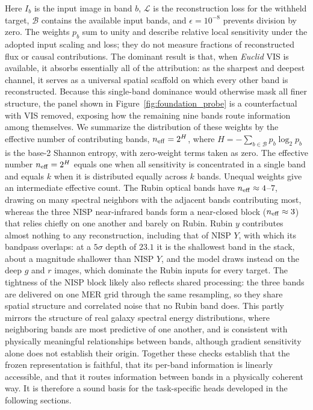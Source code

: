\documentclass[twocolumn,linenumbers]{aastex701}
\begin{document}
Here $I_b$ is the input image in band $b$, $\mathcal L$ is the reconstruction loss for the withheld target, $\mathcal B$ contains the available input bands, and $\epsilon=10^{-8}$ prevents division by zero. The weights $p_b$ sum to unity and describe relative local sensitivity under the adopted input scaling and loss; they do not measure fractions of reconstructed flux or causal contributions. The dominant result is that, when \textit{Euclid} VIS is available, it absorbs essentially all of the attribution: as the sharpest and deepest channel, it serves as a universal spatial scaffold on which every other band is reconstructed. Because this single-band dominance would otherwise mask all finer structure, the panel shown in Figure~\ref{fig:foundation_probe} is a counterfactual with VIS removed, exposing how the remaining nine bands route information among themselves. We summarize the distribution of these weights by the effective number of contributing bands, $n_{\rm eff}=2^H$, where $H=-\sum_{b\in\mathcal B}p_b\log_2p_b$ is the base-2 Shannon entropy, with zero-weight terms taken as zero. The effective number $n_{\rm eff}=2^H$ equals one when all sensitivity is concentrated in a single band and equals $k$ when it is distributed equally across $k$ bands. Unequal weights give an intermediate effective count. The Rubin optical bands have $n_{\rm eff} \approx 4$--$7$, drawing on many spectral neighbors with the adjacent bands contributing most, whereas the three NISP near-infrared bands form a near-closed block ($n_{\rm eff} \approx 3$) that relies chiefly on one another and barely on Rubin. Rubin $y$ contributes almost nothing to any reconstruction, including that of NISP $Y$, with which its bandpass overlaps: at a $5\sigma$ depth of $23.1$ it is the shallowest band in the stack, about a magnitude shallower than NISP $Y$, and the model draws instead on the deep $g$ and $r$ images, which dominate the Rubin inputs for every target. The tightness of the NISP block likely also reflects shared processing: the three bands are delivered on one MER grid through the same resampling, so they share spatial structure and correlated noise that no Rubin band does. This partly mirrors the structure of real galaxy spectral energy distributions, where neighboring bands are most predictive of one another, and is consistent with physically meaningful relationships between bands, although gradient sensitivity alone does not establish their origin.
Together these checks establish that the frozen representation is faithful, that its per-band information is linearly accessible, and that it routes information between bands in a physically coherent way. It is therefore a sound basis for the task-specific heads developed in the following sections.
\end{document}
